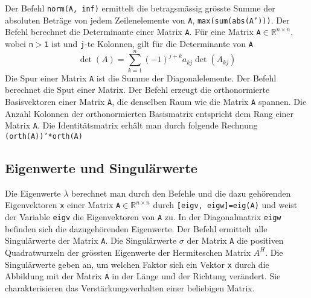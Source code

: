 Der Befehl {\color{red}\texttt{norm(A, inf)}} ermittelt die betragsmässig grösste Summe der absoluten Beträge von jedem Zeilenelemente von \texttt{A}, \texttt{max(sum(abs(A')))}.
\newline\newline
Der Befehl  berechnet die Determinante einer Matrix \texttt{A}. Für eine Matrix \texttt{A$\in\mathbb{R}^{n\times n}$}, wobei \texttt{n$>$1} ist und \texttt{j}-te Kolonnen, gilt für die Determinante von \texttt{A}
\begin{equation}
\boxed{\det(A)=\displaystyle \sum_{k=1}^n(-1)^{j+k}a_{kj}\det(A_{kj})}
\end{equation}
Die Spur einer Matrix \texttt{A} ist die Summe der Diagonalelemente. Der Befehl  berechnet die Sput einer Matrix.
\newline\newline
Der Befehl  erzeugt die orthonormierte Basisvektoren einer Matrix \texttt{A}, die denselben Raum wie die Matrix \texttt{A} spannen. Die Anzahl Kolonnen der orthonormierten Basismatrix entspricht dem Rang einer Matrix \texttt{A}. Die Identitätsmatrix erhält man durch folgende Rechnung \texttt{(orth(A))'*orth(A)}
\subsection{Eigenwerte und Singulärwerte}
Die Eigenwerte \texttt{$\lambda$} berechnet man durch den Befehle  und die dazu gehörenden Eigenvektoren \texttt{x} einer Matrix \texttt{A$\in\mathbb{R}^{n\times n}$} durch {\color{red}\texttt{[eigv, eigw]=eig(A)}} und weist der Variable \texttt{eigv} die Eigenvektoren von \texttt{A} zu. In der Diagonalmatrix \texttt{eigw} befinden sich die dazugehörenden Eigenwerte.
\newline\newline
Der Befehl  ermittelt alle Singulärwerte der Matrix \texttt{A}. Die Singulärwerte \texttt{$\sigma$} der Matrix \texttt{A} die positiven Quadratwurzeln der grössten Eigenwerte der Hermiteschen Matrix \texttt{$A^H$}. Die Singulärwerte geben an, um welchen Faktor sich ein Vektor \texttt{x} durch die Abbildung mit der Matrix \texttt{A} in der Länge und der Richtung verändert. Sie charakterisieren das Verstärkungsverhalten einer beliebigen Matrix.

